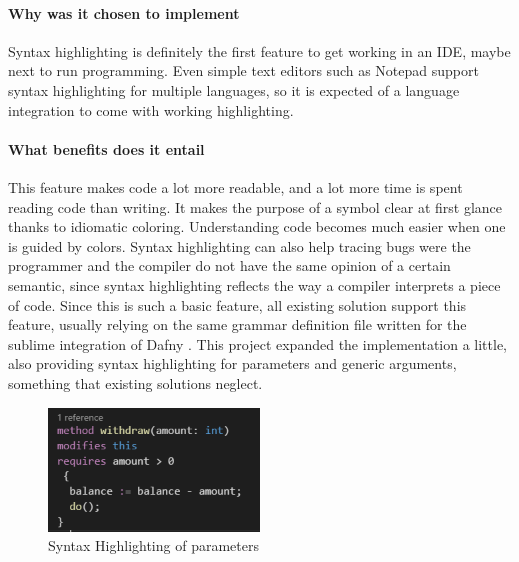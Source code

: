 \paragraph{Why was it chosen to implement}
Syntax highlighting is definitely the first feature to get working in an IDE, maybe next to run programming. Even simple text editors such as Notepad support syntax highlighting for multiple languages, so it is expected of a language integration to come with working highlighting.
\paragraph{What benefits does it entail}
This feature makes code a lot more readable, and a lot more time is spent reading code than writing. It makes the purpose of a symbol clear at first glance thanks to idiomatic coloring. Understanding code becomes much easier when one is guided by colors. Syntax highlighting can also help tracing bugs were the programmer and the compiler do not have the same opinion of a certain semantic, since syntax highlighting reflects the way a compiler interprets a piece of code. \newline
Since this is such a basic feature, all existing solution support this feature, usually relying on the same grammar definition file written for the sublime integration of Dafny \cite{sublime}. This project expanded the implementation a little, also providing syntax highlighting for parameters and generic arguments, something that existing solutions neglect.
\begin{figure}[H]
	\centering
	\includegraphics[width=0.5\textwidth]{img/syntaxHighlightingMethod}
	\caption{Syntax Highlighting of parameters}
	\label{fig:agsyntaxHighlightingMethod}
\end{figure}